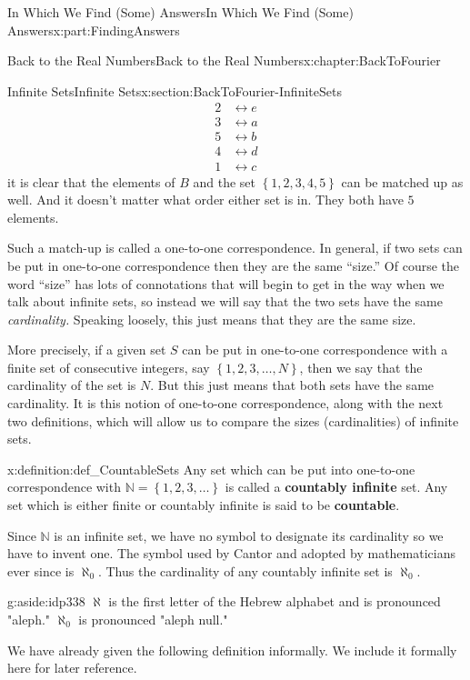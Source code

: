 \documentclass[oneside,10pt,]{book}
\newcommand{\terminology}[1]{\textbf{#1}}
\numberwithin{equation}{section}
\newcommand{\NN}{\mathbb {N}}
\newcommand{\amp}{&}
\begin{document}
\begin{partptx}{In Which We Find (Some) Answers}{}{In Which We Find (Some) Answers}{}{}{x:part:FindingAnswers}
\begin{chapterptx}{Back to the Real Numbers}{}{Back to the Real Numbers}{}{}{x:chapter:BackToFourier}
\begin{sectionptx}{Infinite Sets}{}{Infinite Sets}{}{}{x:section:BackToFourier-InfiniteSets}
\begin{align*}
2\amp \leftrightarrow e\\
3\amp \leftrightarrow a\\
5\amp \leftrightarrow b\\
4\amp \leftrightarrow d\\
1\amp \leftrightarrow c
\end{align*}
it is clear that the elements of \(B\) and the set \(\left\{1,2,3,4,5\right\}\) can be matched up as well. And it doesn't matter what order either set is in. They both have \(5\) elements.%
\par
Such a match-up is called a one-to-one correspondence. In general, if two sets can be put in one-to-one correspondence then they are the same ``size.'' Of course the word ``size'' has lots of connotations that will begin to get in the way when we talk about infinite sets, so instead we will say that the two sets have the same \emph{cardinality.} Speaking loosely, this just means that they are the same size.%
\par
More precisely, if a given set \(S\) can be put in one-to-one correspondence with a finite set of consecutive integers, say \(\left\{1,2,3,\ldots, N\right\}\), then we say that the cardinality of the set is \(N\). But this just means that both sets have the same cardinality. It is this notion of one-to-one correspondence, along with the next two definitions, which will allow us to compare the sizes (cardinalities) of infinite sets.%
\begin{definition}{}{x:definition:def_CountableSets}%
 Any set which can be put into one-to-one correspondence with \(\NN=\left\{1,2,3,\ldots\right\}\) is called a \terminology{countably infinite} set. Any set which is either finite or countably infinite is said to be \terminology{countable}.%
\end{definition}
Since \(\NN\) is an infinite set, we have no symbol to designate its cardinality so we have to invent one. The symbol used by Cantor  and adopted by mathematicians ever since is \(\aleph_0\). Thus the cardinality of any countably infinite set is \(\aleph_0\).%
\begin{aside}{}{g:aside:idp338}%
\(\aleph{}\) is the first letter of the Hebrew alphabet and is pronounced "aleph." \(\aleph_0\) is pronounced "aleph null."%
\end{aside}
We have already given the following definition informally. We include it formally here for later reference.%

\end{sectionptx}
\end{chapterptx}
\end{partptx}
\end{document}
